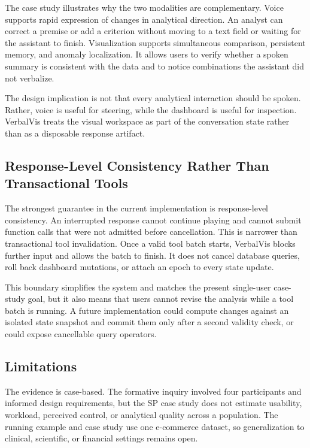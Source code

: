 \documentclass[journal]{IEEEtran}
\begin{document}
The case study illustrates why the two modalities are complementary. Voice supports rapid expression of changes in analytical direction. An analyst can correct a premise or add a criterion without moving to a text field or waiting for the assistant to finish. Visualization supports simultaneous comparison, persistent memory, and anomaly localization. It allows users to verify whether a spoken summary is consistent with the data and to notice combinations the assistant did not verbalize.

The design implication is not that every analytical interaction should be spoken. Rather, voice is useful for steering, while the dashboard is useful for inspection. VerbalVis treats the visual workspace as part of the conversation state rather than as a disposable response artifact.

\subsection{Response-Level Consistency Rather Than Transactional Tools}

The strongest guarantee in the current implementation is response-level consistency. An interrupted response cannot continue playing and cannot submit function calls that were not admitted before cancellation. This is narrower than transactional tool invalidation. Once a valid tool batch starts, VerbalVis blocks further input and allows the batch to finish. It does not cancel database queries, roll back dashboard mutations, or attach an epoch to every state update.

This boundary simplifies the system and matches the present single-user case-study goal, but it also means that users cannot revise the analysis while a tool batch is running. A future implementation could compute changes against an isolated state snapshot and commit them only after a second validity check, or could expose cancellable query operators.

\subsection{Limitations}

The evidence is case-based. The formative inquiry involved four participants and informed design requirements, but the SP case study does not estimate usability, workload, perceived control, or analytical quality across a population. The running example and case study use one e-commerce dataset, so generalization to clinical, scientific, or financial settings remains open.
\end{document}
